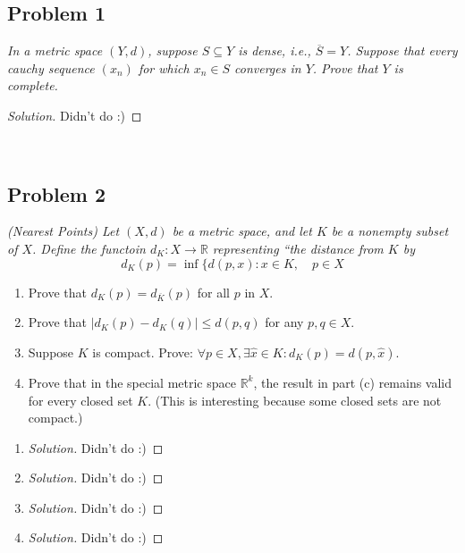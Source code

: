 \documentclass{article}
\newcommand{\R}{{\mathbb R}}
\begin{document}
\subsection*{Problem 1}
{\it In a metric space $(Y,d)$, suppose $S \subseteq Y$ is dense,
i.e., $\overline{S} = Y$.
Suppose that every cauchy sequence $(x_n)$ for which $x_n \in S$ converges in $Y$.
Prove that $Y$ is complete.}

\begin{proof}[Solution]\let\qed\relax
	Didn't do :)
\end{proof}
\clearpage
~\clearpage

\subsection*{Problem 2}
{\it (Nearest Points) Let $(X,d)$ be a metric space,
and let $K$ be a nonempty subset of $X$.
Define the functoin $d_K\colon X \to \R$ representing
``the distance from $K$ by
\[
	d_K(p) = \inf\{d(p,x) \colon x \in K, \quad p \in X
\]
\begin{enumerate}
	\item Prove that $d_K(p) = d_{\overline{K}}(p)$ for all $p$ in $X$.
	\item Prove that $\lvert d_K(p) - d_K(q)\rvert \leq d(p,q)$ for any $p,q \in X$.
	\item Suppose $K$ is compact.
		Prove: $\forall p \in X, \exists \hat{x} \in K \colon d_K(p) = d(p,\hat{x})$.
	\item Prove that in the special metric space $\R^k$,
		the result in part (c) remains valid for every closed set $K$.
		(This is interesting because some closed sets are not compact.)
\end{enumerate}}


\begin{enumerate}
	\item \begin{proof}[Solution]\let\qed\relax
		Didn't do :)
	\end{proof}
	\item \begin{proof}[Solution]\let\qed\relax
		Didn't do :)
	\end{proof}
	\item \begin{proof}[Solution]\let\qed\relax
		Didn't do :)
	\end{proof}
	\item \begin{proof}[Solution]\let\qed\relax
		Didn't do :)
	\end{proof}
\end{enumerate}
\clearpage
~\clearpage
\end{document}
